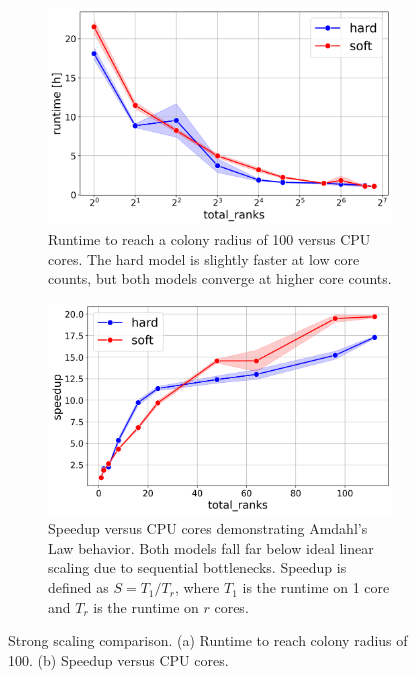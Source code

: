 \documentclass[conference]{IEEEtran}
\begin{document}
\begin{figure}[H]
    \centering
    \begin{subfigure}[b]{1\linewidth}
        \includegraphics[width=\linewidth]{figures/runtimes/strong_scaling_runtime_hard_soft.png}
        \caption{Runtime to reach a colony radius of 100 versus CPU cores. The hard model is slightly faster at low core counts, but both models converge at higher core counts.}
        \label{fig:runtime_hard_soft}
    \end{subfigure}

    \begin{subfigure}[b]{1\linewidth}
        \includegraphics[width=\linewidth]{figures/runtimes/strong_scaling_speedup_hard_soft.png}
        \caption{Speedup versus CPU cores demonstrating Amdahl's Law behavior. Both models fall far below ideal linear scaling due to sequential bottlenecks. Speedup is defined as $S = T_1 / T_r$, where $T_1$ is the runtime on 1 core and $T_r$ is the runtime on $r$ cores.}
        \label{fig:speedup_hard_soft}
    \end{subfigure}

    \caption{Strong scaling comparison. (a) Runtime to reach colony radius of 100. (b) Speedup versus CPU cores.}
\end{figure}
\end{document}
